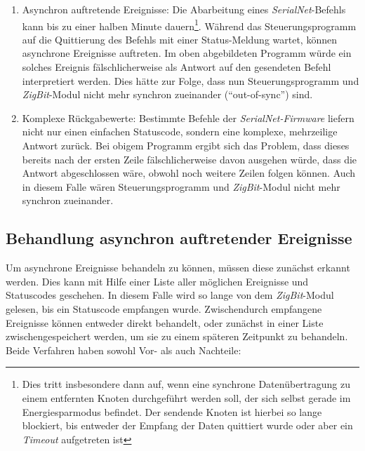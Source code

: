            \begin{enumerate}
                \item{Asynchron auftretende Ereignisse:} Die Abarbeitung eines \emph{SerialNet}-Befehls kann 
                          bis zu einer halben Minute dauern\footnote{Dies tritt insbesondere dann auf, wenn eine
                          synchrone Datenübertragung zu einem entfernten Knoten durchgeführt werden soll, der sich
                          selbst gerade im Energiesparmodus befindet. Der sendende Knoten ist hierbei so lange
                          blockiert, bis entweder der Empfang der Daten quittiert wurde oder aber ein 
                          \emph{Timeout} aufgetreten ist}. Während das Steuerungsprogramm auf die Quittierung des 
                          Befehls mit einer Status-Meldung wartet, können asynchrone Ereignisse auftreten.
                          Im oben abgebildeten Programm würde ein solches Ereignis fälschlicherweise als Antwort
                          auf den gesendeten Befehl interpretiert werden. Dies hätte zur Folge, dass nun 
                          Steuerungsprogramm und \emph{ZigBit}-Modul nicht mehr synchron zueinander ("`out-of-sync"') 
                          sind.

                \item{Komplexe Rückgabewerte:} Bestimmte Befehle der \emph{SerialNet-Firmware} liefern nicht nur
                         einen einfachen Statuscode, sondern eine komplexe, mehrzeilige Antwort zurück. 
                         Bei obigem Programm ergibt sich das Problem, dass dieses bereits nach der ersten Zeile
                         fälschlicherweise davon ausgehen würde, dass die Antwort abgeschlossen wäre, obwohl noch weitere
                         Zeilen folgen können. Auch in diesem Falle wären Steuerungsprogramm und \emph{ZigBit}-Modul nicht mehr
                         synchron zueinander.
            \end{enumerate}

        \subsection{Behandlung asynchron auftretender Ereignisse}
            \label{behandlung_asynchron_auftretender_ereignisse}

            Um asynchrone Ereignisse behandeln zu können, müssen diese zunächst erkannt werden. Dies kann mit
            Hilfe einer Liste aller möglichen Ereignisse und Statuscodes geschehen. In diesem Falle wird so lange
            von dem \emph{ZigBit}-Modul gelesen, bis ein Statuscode empfangen wurde. Zwischendurch empfangene
            Ereignisse können entweder direkt behandelt, oder zunächst in einer Liste zwischengespeichert
            werden, um sie zu einem späteren Zeitpunkt zu behandeln. Beide Verfahren haben sowohl Vor- als auch
            Nachteile:

